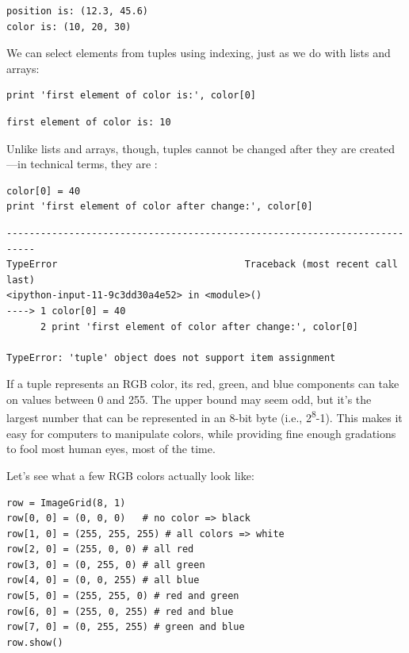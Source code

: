 \documentclass{book}
\begin{document}
\begin{verbatim}
position is: (12.3, 45.6)
color is: (10, 20, 30)
\end{verbatim}

We can select elements from tuples using indexing, just as we do with
lists and arrays:

\begin{verbatim}
print 'first element of color is:', color[0]
\end{verbatim}

\begin{verbatim}
first element of color is: 10
\end{verbatim}

Unlike lists and arrays, though, tuples cannot be changed after they are
created---in technical terms, they are
:

\begin{verbatim}
color[0] = 40
print 'first element of color after change:', color[0]
\end{verbatim}

\begin{verbatim}
---------------------------------------------------------------------------
TypeError                                 Traceback (most recent call last)
<ipython-input-11-9c3dd30a4e52> in <module>()
----> 1 color[0] = 40
      2 print 'first element of color after change:', color[0]

TypeError: 'tuple' object does not support item assignment
\end{verbatim}

If a tuple represents an RGB color, its red, green, and blue components
can take on values between 0 and 255. The upper bound may seem odd, but
it's the largest number that can be represented in an 8-bit byte (i.e.,
2\textsuperscript{8}-1). This makes it easy for computers to manipulate
colors, while providing fine enough gradations to fool most human eyes,
most of the time.

Let's see what a few RGB colors actually look like:

\begin{verbatim}
row = ImageGrid(8, 1)
row[0, 0] = (0, 0, 0)   # no color => black
row[1, 0] = (255, 255, 255) # all colors => white
row[2, 0] = (255, 0, 0) # all red
row[3, 0] = (0, 255, 0) # all green
row[4, 0] = (0, 0, 255) # all blue
row[5, 0] = (255, 255, 0) # red and green
row[6, 0] = (255, 0, 255) # red and blue
row[7, 0] = (0, 255, 255) # green and blue
row.show()
\end{verbatim}
\end{document}
